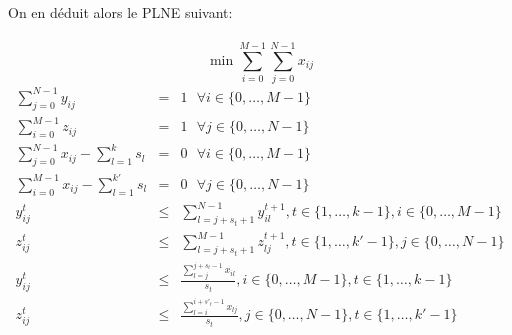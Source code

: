 \documentclass[10pt,a4paper]{article}
\begin{document}
\noindent
On en déduit alors le PLNE suivant: \\ \\
$$\min \sum_{i = 0}^{M-1} \sum_{j = 0}^{N-1} x_{ij}$$
\begin{eqnarray}
\sum_{j = 0}^{N-1} y_{ij} & = & 1 \ \ \ \forall i \in \lbrace 0, \hdots, M-1 \rbrace \\
\sum_{i = 0}^{M-1} z_{ij} & = & 1 \ \ \ \forall j \in \lbrace 0, \hdots, N-1 \rbrace \\
\sum_{j = 0}^{N-1} x_{ij} - \sum_{l = 1}^k s_l & = & 0 \ \ \ \forall i \in \lbrace 0, \hdots, M-1 \rbrace \\
\sum_{i = 0}^{M-1} x_{ij} - \sum_{l = 1}^{k'} s_l & = & 0 \ \ \  \forall j \in \lbrace 0, \hdots, N-1 \rbrace \\
y_{ij}^t & \leq & \sum_{l = j+s_t+1}^{N-1} y_{il}^{t+1} , t \in \lbrace 1, \hdots, k-1 \rbrace, i \in \lbrace 0, \hdots, M-1 \rbrace \\
z_{ij}^t & \leq & \sum_{l = j+s_t+1}^{M-1} z_{lj}^{t+1} , t \in \lbrace 1, \hdots, k'-1 \rbrace, j \in \lbrace 0, \hdots, N-1 \rbrace \\
y_{ij}^{t} & \leq & \frac{\sum_{l = j}^{j+s_t-1} x_{il}}{s_t} , i \in \lbrace 0, \hdots, M-1 \rbrace, t \in \lbrace 1, \hdots, k-1 \rbrace \\
z_{ij}^{t} & \leq & \frac{\sum_{l = i}^{i+s'_t-1} x_{lj}}{s_t}, j \in \lbrace 0, \hdots, N-1 \rbrace, t \in \lbrace 1, \hdots, k'-1 \rbrace
\end{eqnarray}
\end{document}
